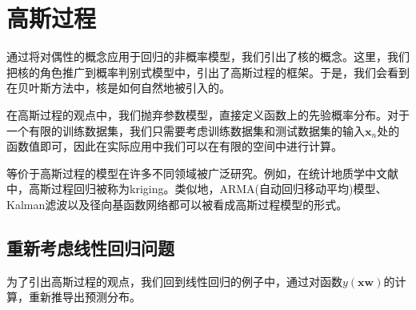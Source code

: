 \section{高斯过程}
通过将对偶性的概念应用于回归的非概率模型，我们引出了核的概念。这里，我们把核的角色推广到概率判别式模型中，引出了高斯过程的框架。于是，我们会看到在贝叶斯方法中，核是如何自然地被引入的。

在高斯过程的观点中，我们抛弃参数模型，直接定义函数上的先验概率分布。对于一个有限的训练数据集，我们只需要考虑训练数据集和测试数据集的输入$\boldsymbol{x}_n$处的函数值即可，因此在实际应用中我们可以在有限的空间中进行计算。

等价于高斯过程的模型在许多不同领域被广泛研究。例如，在统计地质学中文献中，高斯过程回归被称为kriging。类似地，ARMA(自动回归移动平均)模型、Kalman滤波以及径向基函数网络都可以被看成高斯过程模型的形式。
\subsection*{重新考虑线性回归问题}
为了引出高斯过程的观点，我们回到线性回归的例子中，通过对函数$y(\boldsymbol{x}\boldsymbol{w})$的计算，重新推导出预测分布。

